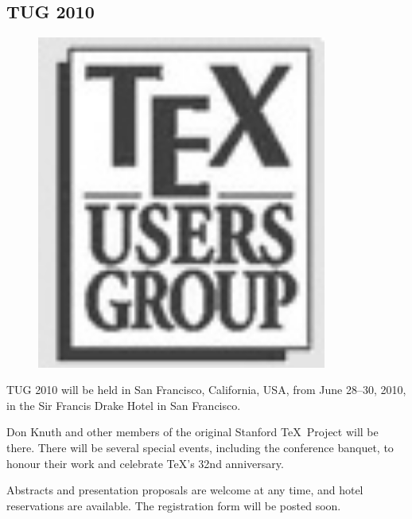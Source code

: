 \documentclass[a4paper,twoside,twocolumn]{article}
\begin{document}
\subsection{TUG 2010}

\begin{figure}
    \vspace{-20pt} %
    \includegraphics[width=0.85\textwidth]{tug_bw.jpg}
    \vspace{-10pt} %
\end{figure}



TUG 2010 will be held in San Francisco, California, USA, from
  June 28--30, 2010, in the Sir Francis Drake Hotel in San Francisco.

Don Knuth and other members of the original Stanford \TeX\ Project will be there.  There will be several special events, including the conference banquet, to honour their work and celebrate \TeX's 32nd anniversary.

Abstracts and presentation proposals are welcome at any time, and hotel reservations are available. The registration form will be posted soon.
\end{document}
